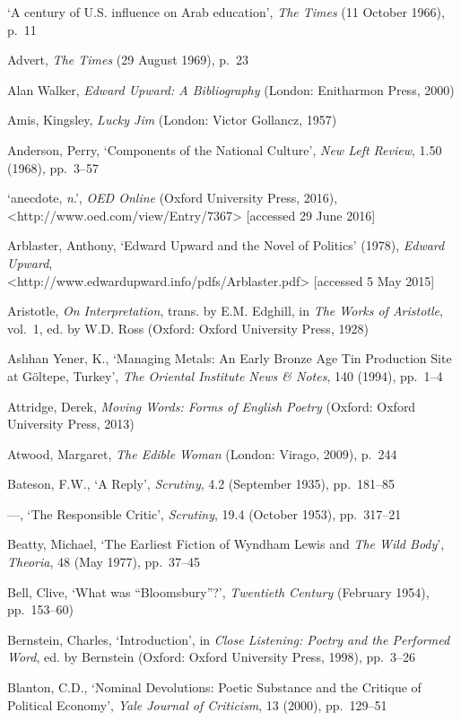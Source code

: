 \documentclass[]{article}
\begin{document}
`A century of U.S. influence on Arab education', \emph{The Times} (11
October 1966), p.~11

Advert, \emph{The Times} (29 August 1969), p.~23

Alan Walker, \emph{Edward Upward: A Bibliography} (London: Enitharmon
Press, 2000)

Amis, Kingsley, \emph{Lucky Jim} (London: Victor Gollancz, 1957)

Anderson, Perry, `Components of the National Culture', \emph{New Left
Review}, 1.50 (1968), pp.~3--57

`anecdote, \emph{n}.', \emph{OED Online} (Oxford University Press,
2016),\\
\textless{}http://www.oed.com/view/Entry/7367\textgreater{} {[}accessed
29 June 2016{]}

Arblaster, Anthony, `Edward Upward and the Novel of Politics' (1978),
\emph{Edward Upward},\\
\textless{}http://www.edwardupward.info/pdfs/Arblaster.pdf\textgreater{}
{[}accessed 5 May 2015{]}

Aristotle, \emph{On Interpretation}, trans. by E.M. Edghill, in
\emph{The Works of Aristotle}, vol.~1, ed. by W.D. Ross (Oxford: Oxford
University Press, 1928)

Aslıhan Yener, K., `Managing Metals: An Early Bronze Age Tin Production
Site at Göltepe, Turkey', \emph{The Oriental Institute News \& Notes},
140 (1994), pp.~1--4

Attridge, Derek, \emph{Moving Words: Forms of English Poetry} (Oxford:
Oxford University Press, 2013)

Atwood, Margaret, \emph{The Edible Woman} (London: Virago, 2009), p.~244

Bateson, F.W., `A Reply', \emph{Scrutiny}, 4.2 (September 1935),
pp.~181--85

---, `The Responsible Critic', \emph{Scrutiny}, 19.4 (October 1953),
pp.~317--21

Beatty, Michael, `The Earliest Fiction of Wyndham Lewis and \emph{The
Wild Body}', \emph{Theoria}, 48 (May 1977), pp.~37--45

Bell, Clive, `What was ``Bloomsbury''?', \emph{Twentieth Century}
(February 1954), pp.~153--60)

Bernstein, Charles, `Introduction', in \emph{Close Listening: Poetry and
the Performed Word}, ed. by Bernstein (Oxford: Oxford University Press,
1998), pp.~3--26

Blanton, C.D., `Nominal Devolutions: Poetic Substance and the Critique
of Political Economy', \emph{Yale Journal of Criticism}, 13 (2000),
pp.~129--51
\end{document}
